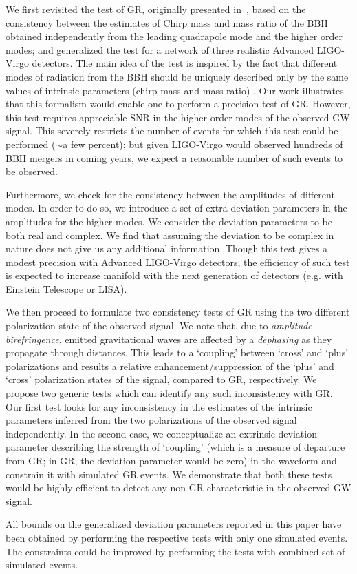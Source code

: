 \documentclass[prd,preprintnumbers,twocolumn,eqsecnum,floatfix,a4paper,nofootinbib,superscriptaddress]{revtex4}
\begin{document}
We first revisited the test of GR, originally presented in~\cite{dhanpal2018}, based on the consistency between the estimates of Chirp mass and mass ratio of the BBH obtained independently from the leading quadrapole mode and the higher order modes; and generalized the test for a network of three realistic Advanced LIGO-Virgo detectors. The main idea of the test is inspired by the fact that different modes of radiation from the BBH should be uniquely described only by the same values of intrinsic parameters (chirp mass and mass ratio) . Our work illustrates that this formalism would enable one to perform a precision test of GR. However, this test requires appreciable SNR in the higher order modes of the observed GW signal. This severely restricts the number of events for which this test could be performed ($\sim$a few percent); but given LIGO-Virgo would observed hundreds of BBH mergers in coming years, we expect a reasonable number of such events to be observed.

Furthermore, we check for the consistency between the amplitudes of different modes. In order to do so, we introduce a set of extra deviation parameters in the amplitudes for the higher modes. We consider the deviation parameters to be both real and complex. We find that assuming the deviation to be complex in nature does not give us any additional information. Though this test gives a modest precision with Advanced LIGO-Virgo detectors, the efficiency of such test is expected to increase manifold with the next generation of detectors (e.g. with Einstein Telescope or LISA). 

We then proceed to formulate two consistency tests of GR using the two different polarization state of the observed signal. We note that, due to \textit{amplitude birefringence}, emitted gravitational waves are affected by a \textit{dephasing} as they propagate through distances. This leads to a `coupling' between `cross' and `plus' polarizations and results a relative enhancement/suppression of the `plus' and `cross' polarization states of the signal, compared to GR,  respectively. We propose two generic tests which can identify any such inconsistency with GR. Our first test  looks for any inconsistency in the estimates of the intrinsic parameters inferred from the two polarizations of the observed signal independently. In the second case, we conceptualize an extrinsic deviation parameter describing the strength of `coupling' (which is a measure of departure from GR; in GR, the deviation parameter would be zero) in the waveform and constrain it with simulated GR events. We demonstrate that both these tests would be highly efficient to detect any non-GR characteristic in the observed GW signal. 

All bounds on the generalized deviation parameters reported in this paper have been obtained by performing the respective tests with only one simulated events. The constraints could be improved by performing the tests with combined set of simulated events.  
\newpage

\end{document}
